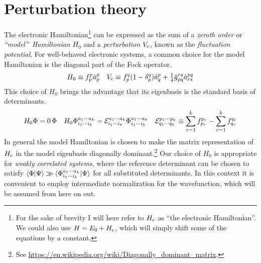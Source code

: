 \documentclass[11pt]{article}
\numberwithin{equation}{section}
\begin{document}
\setcounter{section}{5}
\section{Perturbation theory}

\begin{dfn}
The electronic Hamiltonian\footnote{For the sake of brevity I will here refer to $H_{\mathrm{c}}$ as ``the electronic Hamiltonian''.  We could also use $H=E_0+H_{\mathrm{c}}$, which will simply shift some of the equations by a constant.} can be expressed as the sum of a \textit{zeroth order} or \textit{``model''~Hamiltonian} $H_0$ and a \textit{perturbation} $V_{\mathrm{c}}$, known as the \textit{fluctuation potential}.
For well-behaved electronic systems, a common choice for the model Hamiltonian is the diagonal part of the Fock operator.
\begin{align}
\label{eq:diagonal-fock-model-hamiltonian}
  H_0
\equiv
  f_p^p
  \tilde{a}^p_p
&&
  V_{\mathrm{c}}
\equiv
  f_p^q
  (
    1
  -
    \delta _p^q
  )
  \tilde{a}^p_q
+
  \tfrac{1}{4}
  \overline{g}_{pq}^{rs}
  \tilde{a}^{pq}_{rs}
\end{align}
This choice of $H_0$ brings the advantage that its eigenbasis is the standard basis of determinants.
\begin{align}
\label{eq:model-problem}
  H_0
  \Phi 
=
  0\,
  \Phi 
&&
  H_0
  \Phi _{i_1\cdots i_k}^{a_1\cdots a_k}
=
  \mathcal{E}_{i_1\cdots i_k}^{a_1\cdots a_k}
  \Phi _{i_1\cdots i_k}^{a_1\cdots a_k}
&&
  \mathcal{E}_{q_1\cdots q_k}^{p_1\cdots p_k}
\equiv
  \sum_{r=1}^k
  f_{p_r}^{p_r}
-
  \sum_{r=1}^k
  f_{q_r}^{q_r}
\end{align}
In general the model Hamiltonian is chosen to make the matrix representation of $H_{\mathrm{c}}$ in the model eigenbasis diagonally dominant.\footnote{See \url{https://en.wikipedia.org/wiki/Diagonally_dominant_matrix}.}
Our choice of $H_0$ is appropriate for \textit{weakly correlated systems}, where the reference determinant can be chosen to satisfy $\langle\Phi |\Psi \rangle\gg \langle\Phi _{i_1\cdots i_k}^{a_1\cdots a_k}|\Psi \rangle$ for all substituted determinants.
In this context it is convenient to employ intermediate normalization for the wavefunction, which will be assumed from here on out.
\end{dfn}
\end{document}
